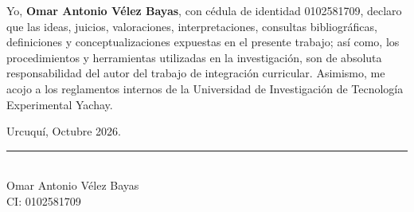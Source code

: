 
Yo, \textbf{Omar Antonio Vélez Bayas}, con cédula de identidad 0102581709, declaro que las ideas, juicios, valoraciones, interpretaciones, consultas bibliográficas, definiciones y conceptualizaciones expuestas en el presente trabajo; así como, los procedimientos y herramientas utilizadas en la investigación, son de absoluta responsabilidad del autor del trabajo de integración curricular. Asimismo, me acojo a los reglamentos internos de la Universidad de Investigación de Tecnología Experimental Yachay.

\vspace{0.6cm}

\noindent Urcuquí, Octubre 2026.

\vspace{2.5cm}

\begin{center}
    \rule[0mm]{70mm}{0.1mm} \\
    {Omar Antonio Vélez Bayas}\\
    CI: 0102581709
\end{center}

\thispagestyle{empty} %
